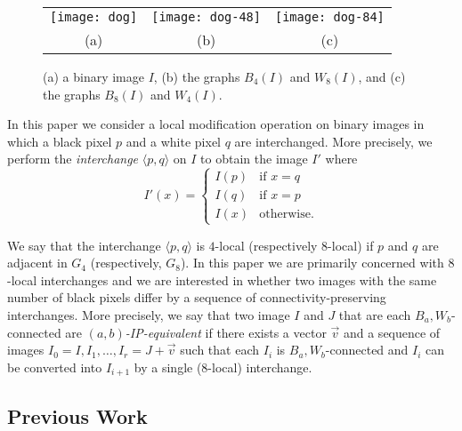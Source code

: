 \documentclass[lotsofwhite,charterfonts]{patmorin}
\newcommand{\ic}[2]{\langle #1,#2 \rangle}
\begin{document}
\begin{figure}[htbp]
\begin{center}\begin{tabular}{ccc}
\texttt{[image: dog]} & 
\texttt{[image: dog-48]} &
\texttt{[image: dog-84]} \\
(a) & (b) & (c) \\
\end{tabular}\end{center}
\caption{(a) a binary image $I$, (b) the graphs $B_4(I)$ and $W_8(I)$, and (c)
the graphs $B_8(I)$ and $W_4(I)$.}
\end{figure}


In this paper we consider a local modification operation on binary
images in which a black pixel $p$ and a white pixel $q$ are
interchanged.  More precisely, we perform the \emph{interchange}
$\ic{p}{q}$ on $I$ to obtain the image $I'$ where
\[
     I'(x) = \left\{\begin{array}{ll}
         I(p) & \mbox{if $x=q$} \\
         I(q) & \mbox{if $x=p$} \\
         I(x) & \mbox{otherwise.}\end{array}\right.
\]

We say that the interchange $\ic{p}{q}$ is $4$-local (respectively
$8$-local) if $p$ and $q$ are adjacent in $G_4$ (respectively, $G_8$).
In this paper we are primarily concerned with $8$-local interchanges
and we are interested in whether two images with the same number of
black pixels differ by a sequence of connectivity-preserving
interchanges.  More precisely, we say that two image $I$ and $J$ that
are each $B_a,W_b$-connected are \emph{$(a,b)$-IP-equivalent}
\cite{rn02} if there exists a vector $\vec{v}$ and a sequence of
images $I_0=I,I_1,\ldots,I_r=J+\vec{v}$ such that each $I_i$ is
$B_a,W_b$-connected and $I_{i}$ can be converted into $I_{i+1}$ by a
single (8-local) interchange.

\subsection{Previous Work}
\end{document}
